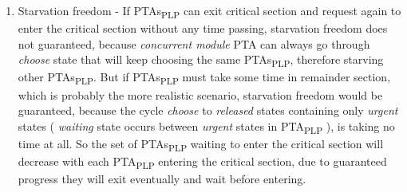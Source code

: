 \begin{enumerate}
\item Starvation freedom - If PTAs\textsubscript{PLP} can exit critical section and request again to enter the critical section without any time passing, starvation freedom does not guaranteed, because \textit{concurrent module} PTA can always go through \textcolor{ColorUppaalState}{\textit{choose}} state that will keep choosing the same PTAs\textsubscript{PLP}, therefore starving other PTAs\textsubscript{PLP}. But if PTAs\textsubscript{PLP} must take some time in remainder section, which is probably the more realistic scenario, starvation freedom would be guaranteed, because the cycle \textcolor{ColorUppaalState}{\textit{choose}} to \textcolor{ColorUppaalState}{\textit{released}} states containing only \textit{urgent} states ( \textcolor{ColorUppaalState}{\textit{waiting}} state occurs between \textit{urgent} states in PTA\textsubscript{PLP} ), is taking no time at all. So the set of PTAs\textsubscript{PLP} waiting to enter the critical section will decrease with each PTA\textsubscript{PLP} entering the critical section, due to guaranteed progress they will exit eventually and wait before entering.
\end{enumerate}
